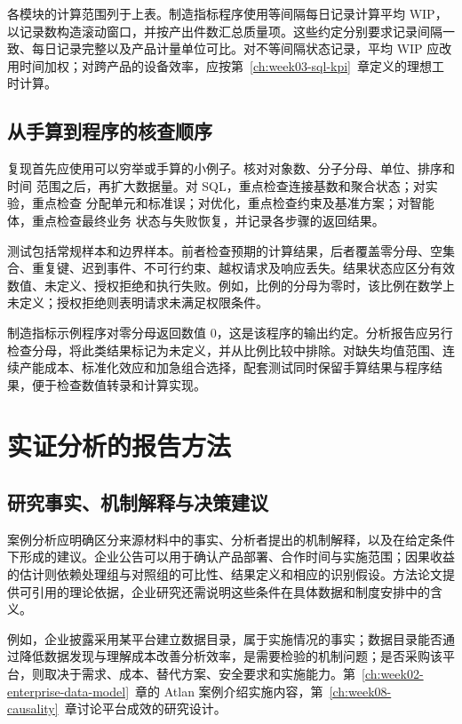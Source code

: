 各模块的计算范围列于上表。制造指标程序使用等间隔每日记录计算平均 WIP，以记录数构造滚动窗口，并按产出件数汇总质量项。这些约定分别要求记录间隔一致、每日记录完整以及产品计量单位可比。对不等间隔状态记录，平均 WIP 应改用时间加权；对跨产品的设备效率，应按第~\ref{ch:week03-sql-kpi}~章定义的理想工时计算。

\section{从手算到程序的核查顺序}
复现首先应使用可以穷举或手算的小例子。核对对象数、分子分母、单位、排序和时间
范围之后，再扩大数据量。对 SQL，重点检查连接基数和聚合状态；对实验，重点检查
分配单元和标准误；对优化，重点检查约束及基准方案；对智能体，重点检查最终业务
状态与失败恢复，并记录各步骤的返回结果。

测试包括常规样本和边界样本。前者检查预期的计算结果，后者覆盖零分母、空集合、重复键、迟到事件、不可行约束、越权请求及响应丢失。结果状态应区分有效数值、未定义、授权拒绝和执行失败。例如，比例的分母为零时，该比例在数学上未定义；授权拒绝则表明请求未满足权限条件。

制造指标示例程序对零分母返回数值 \(0\)，这是该程序的输出约定。分析报告应另行检查分母，将此类结果标记为未定义，并从比例比较中排除。对缺失均值范围、连续产能成本、标准化效应和加急组合选择，配套测试同时保留手算结果与程序结果，便于检查数值转录和计算实现。

\chapter{实证分析的报告方法}
\label{app:evidence}

\section{研究事实、机制解释与决策建议}

案例分析应明确区分来源材料中的事实、分析者提出的机制解释，以及在给定条件下形成的建议。企业公告可以用于确认产品部署、合作时间与实施范围；因果收益的估计则依赖处理组与对照组的可比性、结果定义和相应的识别假设。方法论文提供可引用的理论依据，企业研究还需说明这些条件在具体数据和制度安排中的含义。

例如，企业披露采用某平台建立数据目录，属于实施情况的事实；数据目录能否通过降低数据发现与理解成本改善分析效率，是需要检验的机制问题；是否采购该平台，则取决于需求、成本、替代方案、安全要求和实施能力。第~\ref{ch:week02-enterprise-data-model}~章的 Atlan 案例介绍实施内容，第~\ref{ch:week08-causality}~章讨论平台成效的研究设计。


